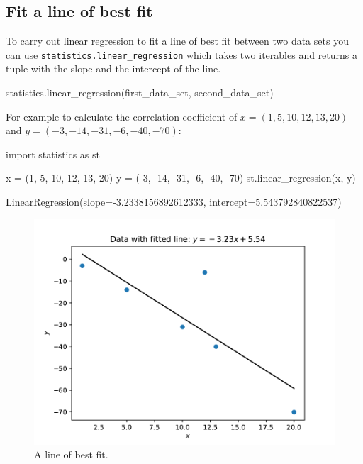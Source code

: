 \subsection{Fit a line of best fit}
\label{\detokenize{tools-for-mathematics/08-statistics/how/main:fit-a-line-of-best-fit}}

To carry out linear regression to fit a line of best fit between two data sets
you can use \texttt{statistics.linear\_regression} which takes two iterables and returns
a tuple with the slope and the intercept of the line.


\begin{api}
statistics.linear_regression(first_data_set, second_data_set)
\end{api}



For example to calculate the correlation coefficient of \(x=(1, 5, 10, 12, 13, 20)\)
and \(y=(-3, -14, -31, -6, -40, -70)\):




\begin{pyin}
import statistics as st

x = (1, 5, 10, 12, 13, 20)
y = (-3, -14, -31, -6, -40, -70)
st.linear_regression(x, y)
\end{pyin}





\begin{raw}
LinearRegression(slope=-3.2338156892612333, intercept=5.543792840822537)
\end{raw}










\begin{figure}[!hbtp]
\begin{center}
\includegraphics[width=.7\textwidth]{./assets/how_to_fit_a_line/main.pdf}
\end{center}
\caption{A line of best fit.}
\label{fig:how_to_fit_a_line}
\end{figure}







